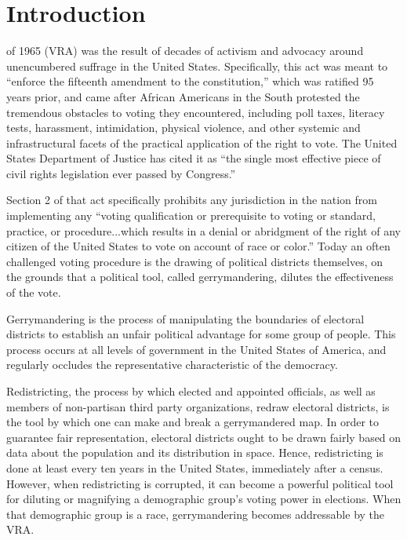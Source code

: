 \chapter{Introduction}
\label{introduction}

 of 1965 (VRA)\cite{vra} was the result of decades of activism and advocacy around unencumbered suffrage in the United States. Specifically, this act was meant to “enforce the fifteenth amendment to the constitution,” which was ratified 95 years prior, and came after African Americans in the South protested the tremendous obstacles to voting they encountered, including poll taxes, literacy tests, harassment, intimidation, physical violence, and other systemic and infrastructural facets of the practical application of the right to vote. The United States Department of Justice has cited it as “the single most effective piece of civil rights legislation ever passed by Congress.”\cite{effective}

Section 2 of that act specifically prohibits any jurisdiction in the nation from implementing any “voting qualification or prerequisite to voting or standard, practice, or procedure...which results in a denial or abridgment of the right of any citizen of the United States to vote on account of race or color.” Today an often challenged voting procedure is the drawing of political districts themselves, on the grounds that a political tool, called gerrymandering, dilutes the effectiveness of the vote.

Gerrymandering is the process of manipulating the boundaries of electoral districts to establish an unfair political advantage for some group of people. This process occurs at all levels of government in the United States of America, and regularly occludes the representative characteristic of the democracy.

Redistricting, the process by which elected and appointed officials, as well as members of non-partisan third party organizations, redraw electoral districts, is the tool by which one can make and break a gerrymandered map. In order to guarantee fair representation, electoral districts ought to be drawn fairly based on data about the population and its distribution in space. Hence, redistricting is done at least every ten years in the United States, immediately after a census. However, when redistricting is corrupted, it can become a powerful political tool for diluting or magnifying a demographic group's voting power in elections. When that demographic group is a race, gerrymandering becomes addressable by the VRA.

